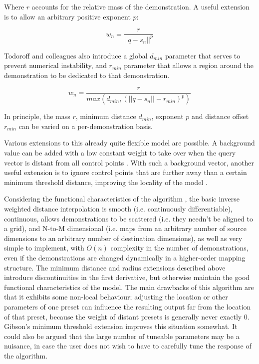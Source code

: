 \documentclass[main.tex]{subfiles}
\begin{document}
Where $r$ accounts for the relative mass of the demonstration. A useful
extension is to allow an arbitrary positive exponent $p$:

\begin{displaymath}
w_n = \frac{r}{||q - s_n||^p}
\end{displaymath}

Todoroff and colleagues also introduce a global $d_{min}$ parameter that serves
to prevent numerical instability, and $r_{min}$ parameter that allows a region
around the demonstration to be dedicated to that demonstration.

\begin{displaymath}
w_n = \frac{r}{max(d_{min}, (||q - s_n|| - r_{min})^p)}
\end{displaymath}

In principle, the mass $r$, minimum distance $d_{min}$, exponent $p$ and distance offset $r_{min}$
can be varied on a per-demonstration basis.

Various extensions to this already quite flexible model are possible. A background
value can be added with a low constant weight to take over when the query vector
is distant from all control points \cite{todoroff2009icmc_interpolation-tools}.
With such a background vector, another useful extension is to ignore control
points that are further away than a certain minimum threshold distance, improving
the locality of the model \cite{gibson2019smc}.

Considering the functional characteristics of the algorithm \cite{nort2014cmj,
nort2004nime_geometric-properties}, the basic inverse weighted distance
interpolation is smooth (i.e. continuously differentiable), continuous, allows
demonstrations to be scattered (i.e. they needn't be aligned to a grid), and
N-to-M dimensional (i.e. maps from an arbitrary number of source dimensions to
an arbitrary number of destination dimensions), as well as very simple to
implement, with $O(n)$ complexity in the number of demonstrations, even if the
demonstrations are changed dynamically in a higher-order mapping structure. The
minimum distance and radius extensions described above introduce
discontinuities in the first derivative, but otherwise maintain the good
functional characteristics of the model. The main drawbacks of this algorithm
are that it exhibits some non-local behaviour; adjusting the location or other
parameters of one preset can influence the resulting output far from the
location of that preset, because the weight of distant presets is generally
never exactly 0. Gibson's minimum threshold extension \cite{gibson2019smc}
improves this situation somewhat. It could also be argued that the large number
of tuneable parameters may be a nuisance, in case the user does not wish to
have to carefully tune the response of the algorithm.
\end{document}
